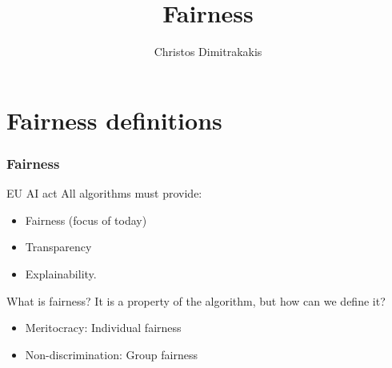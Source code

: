 \documentclass{beamer}
\title{Fairness}
\author[C. Dimitrakakis]{Christos Dimitrakakis}
\begin{document}
\begin{frame}
  \titlepage
\end{frame}


\section{Fairness definitions}

\begin{frame}
  \frametitle{Fairness}
  \begin{block}{EU AI act}
    All algorithms must provide:
    \begin{itemize}
    \item Fairness (focus of today)
    \item Transparency
    \item Explainability.
    \end{itemize}
  \end{block}

  \begin{block}{What is fairness?}
    It is a property of the \alert{algorithm}, but how can we define it?
    \begin{itemize}
    \item<2-> \alert{Meritocracy}: Individual fairness
    \item<3-> \alert{Non-discrimination}: Group fairness
    \end{itemize}
  \end{block}
\end{frame}
\end{document}
